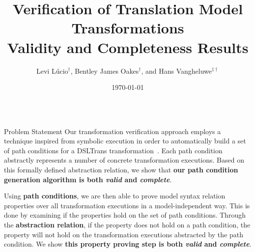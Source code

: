 \documentclass[final,hyperref={pdfpagelabels=false}]{beamer}
\title[Fancy Posters]{Verification of Translation Model Transformations\\\vspace{.5cm}Validity and Completeness Results}
\author[Dreuw \& Deselaers]{Levi L\'ucio$^{\dagger}$, Bentley James Oakes$^{\dagger}$, and Hans Vangheluwe$^{\ddagger\dagger}$}
\institute[McGill University]{$^{\dagger}$McGill University, Montreal,
    Canada\qquad $^{\ddagger}$University of Antwerp, Belgium}
\date[June 14th, 2011]{\today}
\begin{document}
  \begin{frame}{} 
     \vspace{-1.5cm}
      \begin{columns}[t]
        \begin{column}{.993\linewidth}
        \begin{block}{\large Problem Statement}\vspace{.5cm}
 Our transformation verification approach employs a technique inspired from
 symbolic execution in order to automatically build a set of path
 conditions for a DSLTrans transformation~\cite{MODELS2010,SLE2010}. Each path condition abstractly represents a number of concrete
 transformation executions. Based on this formally defined abstraction relation, we show that \textbf{our path condition
 generation algorithm is both \emph{valid} and \emph{complete}}.
   		
 Using \textbf{path conditions}, we are then able to prove model syntax relation properties over all transformation
 executions in a model-independent way.
 This is done by examining if the properties hold on the set of path conditions.
 Through the \textbf{abstraction relation}, if the property does not hold on a path
 condition, the property will not hold on the transformation executions
 abstracted by the path condition. We show \textbf{this property proving step is
 both \emph{valid} and \emph{complete}}.\vspace{1cm}
        \end{block}
        \end{column}
      \end{columns}         
 

\end{frame}
\end{document}
